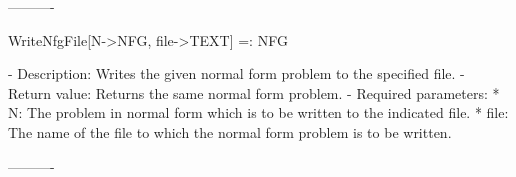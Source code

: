 \begin{itemize}
----------

WriteNfgFile[N->NFG, file->TEXT] =: NFG

   -	Description:  Writes the given normal form problem to the specified 
	file.  
   -	Return value:  Returns the same normal form problem.
   -	Required parameters:
	  *  N:  The problem in normal form which is to be written to the
		indicated file.
	  *  file:  The name of the file to which the normal form problem is
		to be written.

----------
\end{itemize}





























